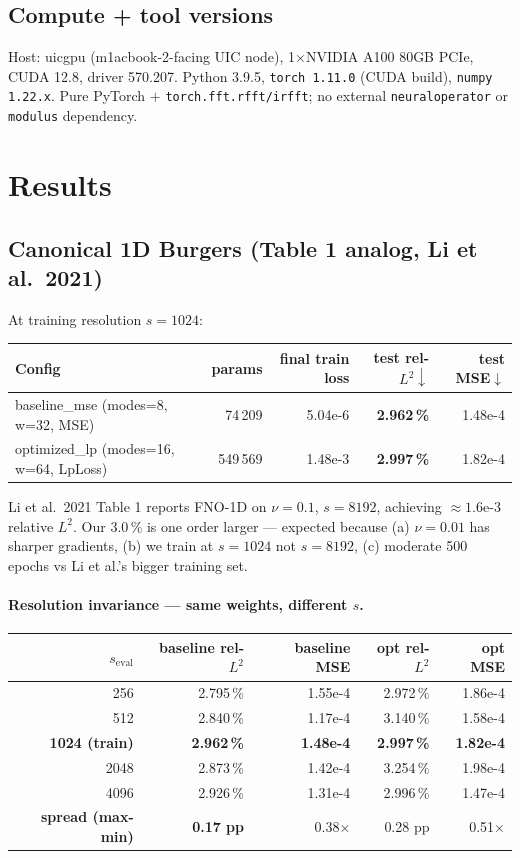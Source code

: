 \documentclass[11pt]{article}
\begin{document}
\subsection{Compute + tool versions}
Host: uicgpu (m1acbook-2-facing UIC node), 1$\times$NVIDIA A100 80GB PCIe, CUDA 12.8,
driver 570.207. Python 3.9.5, \texttt{torch 1.11.0} (CUDA build), \texttt{numpy 1.22.x}.
Pure PyTorch $+$ \texttt{torch.fft.rfft/irfft}; no external \texttt{neuraloperator} or
\texttt{modulus} dependency.

\section{Results}

\subsection{Canonical 1D Burgers (Table 1 analog, Li et al.\ 2021)}
At training resolution $s=1024$:
\begin{center}
\begin{tabular}{lrrrr}
\toprule
Config & params & final train loss & test rel-$L^2\downarrow$ & test MSE$\downarrow$ \\
\midrule
baseline\_mse (modes=8, w=32, MSE) & 74\,209 & 5.04e-6 & \textbf{2.962\,\%} & 1.48e-4 \\
optimized\_lp (modes=16, w=64, LpLoss) & 549\,569 & 1.48e-3 & \textbf{2.997\,\%} & 1.82e-4 \\
\bottomrule
\end{tabular}
\end{center}

\noindent Li et al.\ 2021 Table 1 reports FNO-1D on $\nu=0.1$, $s=8192$, achieving
$\approx 1.6\text{e-}3$ relative $L^2$. Our 3.0\,\% is one order larger --- expected because
(a) $\nu=0.01$ has sharper gradients, (b) we train at $s=1024$ not $s=8192$, (c) moderate 500
epochs vs Li et al.'s bigger training set.

\paragraph{Resolution invariance --- same weights, different $s$.}
\begin{center}
\begin{tabular}{rrrrr}
\toprule
$s_\text{eval}$ & baseline rel-$L^2$ & baseline MSE & opt rel-$L^2$ & opt MSE \\
\midrule
256 & 2.795\,\% & 1.55e-4 & 2.972\,\% & 1.86e-4 \\
512 & 2.840\,\% & 1.17e-4 & 3.140\,\% & 1.58e-4 \\
\textbf{1024 (train)} & \textbf{2.962\,\%} & \textbf{1.48e-4} & \textbf{2.997\,\%} & \textbf{1.82e-4} \\
2048 & 2.873\,\% & 1.42e-4 & 3.254\,\% & 1.98e-4 \\
4096 & 2.926\,\% & 1.31e-4 & 2.996\,\% & 1.47e-4 \\
\midrule
\textbf{spread (max-min)} & \textbf{0.17 pp} & 0.38$\times$ & 0.28 pp & 0.51$\times$ \\
\bottomrule
\end{tabular}
\end{center}
\end{document}
